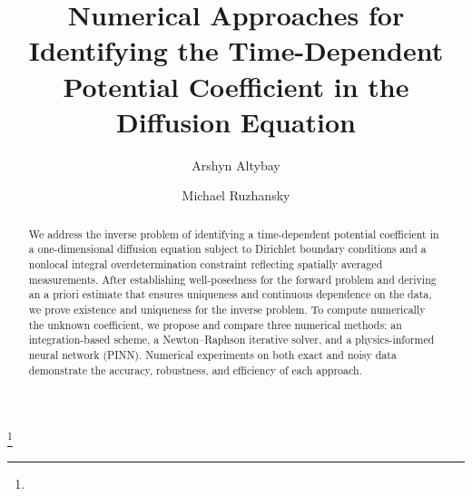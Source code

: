 \documentclass[reqno]{amsart}
\begin{document}
\title[\hfil Identification of the time-dependent coefficient]
{Numerical Approaches for Identifying the Time-Dependent Potential Coefficient in the Diffusion Equation}

\author[Arshyn Altybay]{Arshyn Altybay}
\address{
Arshyn Altybay: 
\endgraf
Institute of Mathematics and Mathematical Modeling,
 Pushkin str., 050010 Almaty, Kazakhstan
\endgraf
and
\endgraf
Department of Mathematics: Analysis, Logic and Discrete Mathematics, 
  \endgraf
Ghent University, Krijgslaan 281, Building S8, B 9000 Ghent, Belgium
  \endgraf
{\it E-mail address} {\rm arshyn.altybay@gmail.com, arshyn.altybay@ugent.be}
}

\author[M. Ruzhansky]{Michael Ruzhansky}
\address{
  Michael Ruzhansky:
  \endgraf
  Department of Mathematics: Analysis, Logic and Discrete Mathematics
  \endgraf
  Ghent University, Krijgslaan 281, Building S8, B 9000 Ghent, Belgium
  \endgraf
  and
  \endgraf
  School of Mathematical Sciences
  \endgraf
  Queen Mary University of London, United Kingdom
  \endgraf
  {\it E-mail address} {\rm michael.ruzhansky@ugent.be}
}

\thanks{}
 

\begin{abstract}
We address the inverse problem of identifying a time-dependent potential coefficient in a one-dimensional diffusion equation subject to Dirichlet boundary conditions and a nonlocal integral overdetermination constraint reflecting spatially averaged measurements. After establishing well-posedness for the forward problem and deriving an a priori estimate that ensures uniqueness and continuous dependence on the data, we prove existence and uniqueness for the inverse problem. To compute numerically the unknown coefficient, we propose and compare three numerical methods: an integration-based scheme, a Newton–Raphson iterative solver, and a physics-informed neural network (PINN). Numerical experiments on both exact and noisy data demonstrate the accuracy, robustness, and efficiency of each approach.
\end{abstract}


\maketitle
{} 
\newtheorem{theorem}{Theorem}[section]
\newtheorem{lemma}[theorem]{Lemma}
\newtheorem{corollary}[theorem]{Corollary}
\newtheorem{remark}[theorem]{Remark}
\newtheorem{definition}[theorem]
{Definition}
\newtheorem{proposition}[theorem]
{Proposition}
\allowdisplaybreaks
\end{document}
